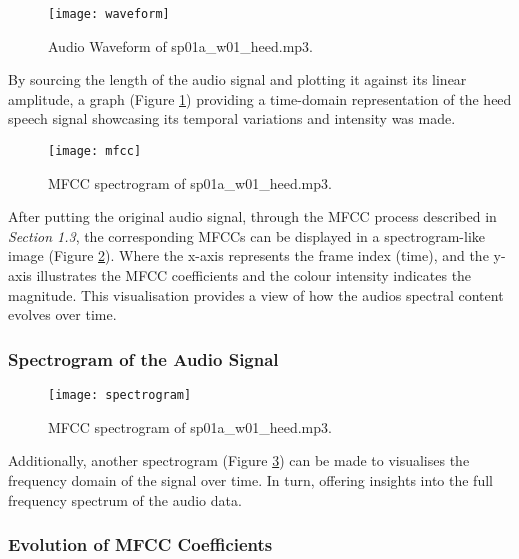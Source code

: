 \documentclass{article}
\begin{document}
\begin{figure}[!h]
\begin{center}
\texttt{[image: waveform]}
\end{center}
\caption{\label{fig:waveform} Audio Waveform of sp01a\_w01\_heed.mp3.}
\end{figure}

By sourcing the length of the audio signal and plotting it against its linear amplitude,  a graph (Figure \ref{fig:waveform}) providing a time-domain representation of the heed speech signal showcasing its temporal variations and intensity was made.

\begin{figure}[!h]
\begin{center}
\texttt{[image: mfcc]}
\end{center}
\caption{\label{fig:mfcc} MFCC spectrogram of sp01a\_w01\_heed.mp3.}
\end{figure}

After putting the original audio signal, through the MFCC process described in \textit{Section 1.3}, the corresponding MFCCs can be displayed in a spectrogram-like image (Figure \ref{fig:mfcc}). Where the x-axis represents the frame index (time), and the y-axis illustrates the MFCC coefficients and the colour intensity indicates the magnitude. This visualisation provides a view of how the audios spectral content evolves over time.


\subsubsection{Spectrogram of the Audio Signal}

\begin{figure}[!h]
\begin{center}
\texttt{[image: spectrogram]}
\end{center}
\caption{\label{fig:spectrogram} MFCC spectrogram of sp01a\_w01\_heed.mp3.}
\end{figure}

Additionally, another spectrogram (Figure \ref{fig:spectrogram}) can be made to visualises the frequency domain of the signal over time. In turn, offering insights into the full frequency spectrum of the audio data.


\subsubsection{Evolution of MFCC Coefficients}
\end{document}
